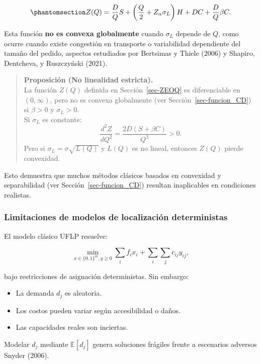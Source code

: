 \documentclass[
  spanish,
  us-letterpaper,
]{scrreprt}
\providecommand{\tightlist}{%
  \setlength{\itemsep}{0pt}\setlength{\parskip}{0pt}}
\numberwithin{equation}{section}
\begin{document}
\begin{equation}\phantomsection\label{eq-Zq}{
Z(Q)=\frac{D}{Q}S+\left(\frac{Q}{2}+Z_\alpha\sigma_L\right)H+DC+\frac{D}{Q}\beta C. 
}\end{equation}

Esta función \textbf{no es convexa globalmente} cuando \(\sigma_L\)
depende de \(Q\), como ocurre cuando existe congestión en transporte o
variabilidad dependiente del tamaño del pedido, aspectos estudiados por
Bertsimas y Thiele (2006) y Shapiro, Dentcheva, y Ruszczyński (2021).

\begin{quote}
\textbf{Proposición (No linealidad estricta).}\\
La función \(Z(Q)\) definida en Sección~\ref{sec-ZEOQ} es diferenciable
en \((0,\infty)\), pero no es convexa globalmente (ver
Sección~\ref{sec-funcion_CD}) si \(\beta>0\) y \(\sigma_L>0\).\\
Si \(\sigma_L\) es constante: \[
\frac{d^2 Z}{dQ^2}=\frac{2D(S+\beta C)}{Q^3}>0.
\] Pero si \(\sigma_L=\sigma\sqrt{L(Q)}\) y \(L(Q)\) es no lineal,
entonces \(Z(Q)\) pierde convexidad.
\end{quote}

Esto demuestra que muchos métodos clásicos basados en convexidad y
separabilidad (ver Sección~\ref{sec-funcion_CD}) resultan inaplicables
en condiciones realistas.

\subsubsection{Limitaciones de modelos de localización
deterministas}\label{sec-determinista}

El modelo clásico UFLP resuelve:

\[
\min_{x\in\{0,1\}^m, y\ge 0}\sum_{i}f_i x_i + \sum_{i}\sum_j c_{ij}y_{ij},
\]

bajo restricciones de asignación deterministas. Sin embargo:

\begin{itemize}
\tightlist
\item
  La demanda \(d_j\) es aleatoria.
\item
  Los costos pueden variar según accesibilidad o daños.
\item
  Las capacidades reales son inciertas.
\end{itemize}

Modelar \(d_j\) mediante \(\mathbb{E}[d_j]\) genera soluciones frágiles
frente a escenarios adversos Snyder (2006).
\end{document}
